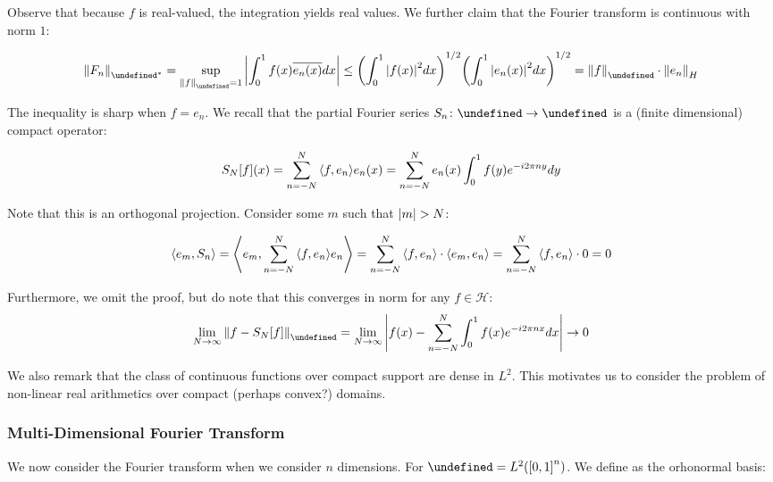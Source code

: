\documentclass[12pt]{article}
\let\H\undefined
\newcommand{\H}{\mathcal{H}}
\begin{document}
Observe that because $f$ is real-valued, the integration yields real values.
We further claim that the Fourier transform is continuous with
norm $1$:

\begin{align*}
  \norm{F_n}_{\adj{\H}}
    = \sup_{\norm{f}_{\H} = 1}
        \abs{\int_0^1 f\parens{x} \overline{e_n \parens{x}} dx}
    \leq \parens{\int_0^1 \abs{f\parens{x}}^2 dx}^{1/2}
              \parens{\int_0^1 \abs{e_n \parens{x}}^2 dx}^{1/2}
    = \norm{f}_{\H} \cdot \norm{e_n}_{H}
\end{align*}

The inequality is sharp when $f = e_{n}$.
We recall that the partial Fourier series $\type{S_n}{\H}{\H}$ is a
(finite dimensional) compact operator:

\begin{align*}
  S_N {\left[f\right]} {\left(x\right)}
    = \sum_{n = -N}^{N} {\left\langle f, e_n\right\rangle} e_n {\left(x\right)}
    = \sum_{n = -N}^{N} e_n {\left(x\right)} \int_0^1 f(y) e^{- i 2 \pi n y} dy
\end{align*}

Note that this is an orthogonal projection.
Consider some $m$ such that
${\left\lvert m\right\rvert} > N$:

\begin{align*}
  {\left\langle e_m, S_n\right\rangle}
    = {\left\langle e_m, \sum_{n = -N}^{N} {\left\langle f, e_n\right\rangle} e_n\right\rangle}
    = \sum_{n = -N}^{N} {\left\langle f, e_n\right\rangle} \cdot {\left\langle e_m, e_n\right\rangle}
    = \sum_{n = -N}^{N} {\left\langle f, e_n\right\rangle} \cdot 0
    = 0
\end{align*}

Furthermore, we omit the proof, but do note that this converges in norm
for any $f \in \mathcal{H}$:
\begin{align*}
  \lim_{N \to \infty} \norm{f - S_N \brackets{f}}_{\H}
    = \lim_{N \to \infty}
      \abs{f\parens{x} -
            \sum_{n = -N}^{N} \int_0^1 f\parens{x} e^{-i 2\pi nx} dx}
    \to 0
\end{align*}

We also remark that the class of continuous functions over
compact support are dense in $L^2$.
This motivates us to consider the problem of non-linear real arithmetics
over compact (perhaps convex?) domains.


\subsubsection{Multi-Dimensional Fourier Transform}
We now consider the Fourier transform when we consider $n$ dimensions.
For $\H = L^2 \parens{\brackets{0, 1}^n}$.
We define as the orhonormal basis:
\end{document}
